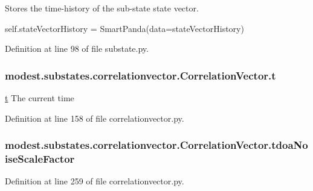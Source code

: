 Stores the time-\/history of the sub-\/state state vector. 

self.\+state\+Vector\+History = Smart\+Panda(data=state\+Vector\+History) 

Definition at line 98 of file substate.\+py.

\subsubsection[{\texorpdfstring{t}{t}}]{\setlength{\rightskip}{0pt plus 5cm}modest.\+substates.\+correlationvector.\+Correlation\+Vector.\+t}\hypertarget{classmodest_1_1substates_1_1correlationvector_1_1CorrelationVector_a127ca6c8eed6a2e822dbac7e83458bf3}{}\label{classmodest_1_1substates_1_1correlationvector_1_1CorrelationVector_a127ca6c8eed6a2e822dbac7e83458bf3}


\hyperlink{classmodest_1_1substates_1_1correlationvector_1_1CorrelationVector_a127ca6c8eed6a2e822dbac7e83458bf3}{t} The current time 



Definition at line 158 of file correlationvector.\+py.

\subsubsection[{\texorpdfstring{tdoa\+Noise\+Scale\+Factor}{tdoaNoiseScaleFactor}}]{\setlength{\rightskip}{0pt plus 5cm}modest.\+substates.\+correlationvector.\+Correlation\+Vector.\+tdoa\+Noise\+Scale\+Factor}\hypertarget{classmodest_1_1substates_1_1correlationvector_1_1CorrelationVector_a733786d20ee5e03a7c28420b5db01dcb}{}\label{classmodest_1_1substates_1_1correlationvector_1_1CorrelationVector_a733786d20ee5e03a7c28420b5db01dcb}


Definition at line 259 of file correlationvector.\+py.

